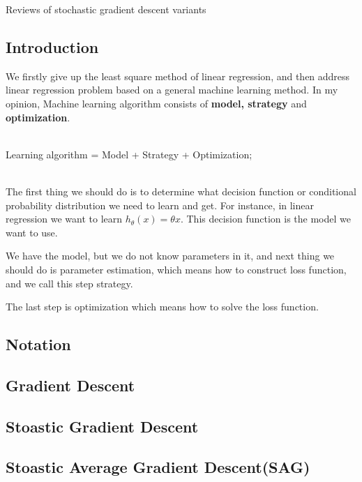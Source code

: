 \documentclass[]{book}
\theoremstyle{definition}
\begin{document}
\begin{center}
{\Large Reviews of stochastic gradient descent variants}\\
\end{center}

\vspace{0.2 cm}


\subsection*{Introduction}
We firstly give up the least square method of linear regression, and then address linear regression problem based on a general machine learning method. In my opinion, Machine learning algorithm consists of \textbf{model, strategy} and \textbf{optimization}.\\
\\
\centerline{Learning algorithm = Model + Strategy + Optimization;}\\

The first thing we should do is to determine what decision function or conditional probability distribution we need to learn and get. For instance, in linear regression we want to learn $h_\theta(x)=\theta x$. This decision function is the model we want to use.

We have the model, but we do not know parameters in it, and next thing we should do is parameter estimation, which means how to construct loss function, and we call this step strategy.

The last step is optimization which means how to solve the loss function.
\subsection*{Notation}
\subsection*{Gradient Descent}
\subsection*{Stoastic Gradient Descent}
\subsection*{Stoastic Average Gradient Descent(SAG)}
\end{document}
